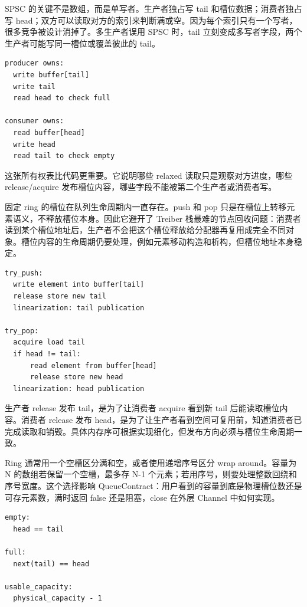 SPSC 的关键不是数组，而是单写者。生产者独占写 tail 和槽位数据；消费者独占写 head；双方可以读取对方的索引来判断满或空。因为每个索引只有一个写者，很多竞争被设计消掉了。多生产者误用 SPSC 时，tail 立刻变成多写者字段，两个生产者可能写同一槽位或覆盖彼此的 tail。

\begin{lstlisting}[numbers=none,caption={SPSC 字段所有权}]
producer owns:
  write buffer[tail]
  write tail
  read head to check full

consumer owns:
  read buffer[head]
  write head
  read tail to check empty
\end{lstlisting}

这张所有权表比代码更重要。它说明哪些 relaxed 读取只是观察对方进度，哪些 release/acquire 发布槽位内容，哪些字段不能被第二个生产者或消费者写。

固定 ring 的槽位在队列生命周期内一直存在。push 和 pop 只是在槽位上转移元素语义，不释放槽位本身。因此它避开了 Treiber 栈最难的节点回收问题：消费者读到某个槽位地址后，生产者不会把这个槽位释放给分配器再复用成完全不同对象。槽位内容的生命周期仍要处理，例如元素移动构造和析构，但槽位地址本身稳定。

\begin{lstlisting}[numbers=none,caption={SPSC push/pop 的线性化直觉}]
try_push:
  write element into buffer[tail]
  release store new tail
  linearization: tail publication

try_pop:
  acquire load tail
  if head != tail:
      read element from buffer[head]
      release store new head
  linearization: head publication
\end{lstlisting}

生产者 release 发布 tail，是为了让消费者 acquire 看到新 tail 后能读取槽位内容。消费者 release 发布 head，是为了让生产者看到空间可复用前，知道消费者已完成读取和销毁。具体内存序可根据实现细化，但发布方向必须与槽位生命周期一致。

Ring 通常用一个空槽区分满和空，或者使用递增序号区分 wrap around。容量为 N 的数组若保留一个空槽，最多存 N-1 个元素；若用序号，则要处理整数回绕和序号宽度。这个选择影响 QueueContract：用户看到的容量到底是物理槽位数还是可存元素数，满时返回 false 还是阻塞，close 在外层 Channel 中如何实现。

\begin{lstlisting}[numbers=none,caption={保留一个空槽的满空判断}]
empty:
  head == tail

full:
  next(tail) == head

usable_capacity:
  physical_capacity - 1
\end{lstlisting}

